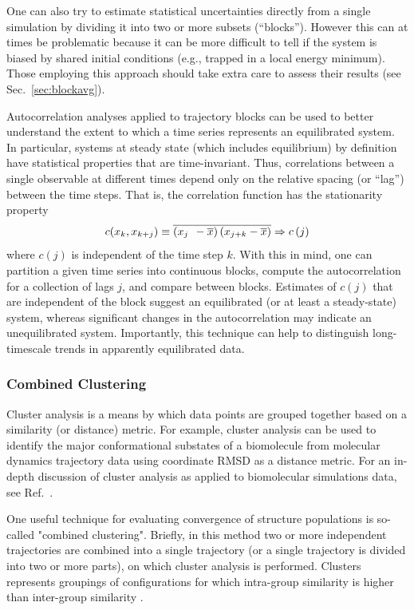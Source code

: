One can also try to estimate statistical uncertainties directly from a single simulation by dividing it into two or more subsets (``blocks''). However this can at times be problematic because it can be more difficult to tell if the system is biased by shared initial conditions (e.g., trapped in a local energy minimum). Those employing this approach should take extra care to assess their results (see Sec.~\ref{sec:blockavg}).


Autocorrelation analyses applied to trajectory blocks can be used to better understand the extent to which a time series represents an equilibrated system.  In particular, systems at steady state (which includes equilibrium) by definition have statistical properties that are time-invariant.  Thus, correlations between a single observable at different times depend only on the relative spacing (or ``lag'') between the time steps.  That is, the correlation function has the stationarity property
\begin{equation}
  c(x_k,x_{k+j}) \equiv %
    \overline{
      \left(x_{j{\color{white}k}} - \overline{x} \right)
      \left(x_{j+k} - \overline{x} \right)
    }
  \Rightarrow c\left(j\right)
\end{equation}
where $c\left(j\right)$ is independent of the time step $k$.  With this in mind, one can partition a given time series into continuous blocks, compute the autocorrelation for a collection of lags $j$, and compare between blocks.  Estimates of $c\left(j\right)$ that are independent of the block suggest an equilibrated (or at least a steady-state) system, whereas significant changes in the autocorrelation may indicate an unequilibrated system.  Importantly, this technique can help to distinguish long-timescale trends in apparently equilibrated data.


\subsubsection*{Combined Clustering}

Cluster analysis is a means by which data points are grouped together based on a similarity (or distance) metric. For example, cluster analysis can be used to identify the major conformational substates of a biomolecule from molecular dynamics trajectory data using coordinate RMSD as a distance metric. For an in-depth discussion of cluster analysis as applied to biomolecular simulations data, see Ref.\ \citep{Shao2007}.

One useful technique for evaluating convergence of structure populations is so-called "combined clustering". Briefly, in this method two or more independent trajectories are combined into a single trajectory (or a single trajectory is divided into two or more parts), on which cluster analysis is performed. Clusters represents groupings of configurations for which intra-group similarity is higher than inter-group similarity \citep{Okur2006}.

